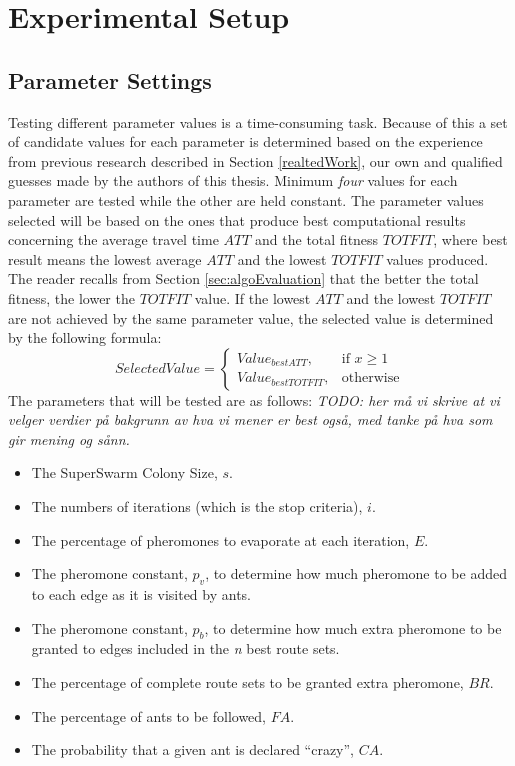\section{Experimental Setup}

 
\subsection{Parameter Settings}
\label{subsec:parameterSettings_setup}

Testing different parameter values is a time-consuming task. Because of this a set of candidate values for each parameter is determined based on the experience from previous research described in Section \vref{realtedWork}, our own  and qualified guesses made by the authors of this thesis. Minimum \textit{four} values for each parameter are tested while the other are held constant. The parameter values selected will be based on the ones that produce best computational results concerning the average travel time $ATT$ and the total fitness $TOTFIT$, where best result means the lowest average $ATT$ and the lowest $TOTFIT$ values produced. The reader recalls from Section \vref{sec:algoEvaluation} that the better the total fitness, the lower the $TOTFIT$ value. If the lowest $ATT$ and the lowest $TOTFIT$ are not achieved by the same parameter value, the selected value is determined by the following formula:
\[
    SelectedValue= 
\begin{cases}
    Value_{bestATT},& \text{if } x\geq 1\\
    Value_{bestTOTFIT},              & \text{otherwise}
\end{cases}
\]
The parameters that will be tested are as follows:
\emph{\color{blue} TODO: her må vi skrive at vi velger verdier på bakgrunn av hva vi mener er best også, med tanke på hva som gir mening og sånn. }  

\begin{itemize}
\item The SuperSwarm Colony Size, $s$. 
\item The numbers of iterations (which is the stop criteria), $i$.
\item The percentage of pheromones to evaporate at each iteration, $E$.
\item The pheromone constant, $p_v$, to determine how much pheromone to be added to each edge as it is visited by ants.
\item The pheromone constant, $p_b$, to determine how much extra pheromone to be granted to edges included in the \textit{n} best route sets.
\item The percentage of complete route sets to be granted extra pheromone, $BR$.
\item The percentage of ants to be followed, $FA$.
\item The probability that a given ant is declared ``crazy'', $CA$.
\end{itemize}


